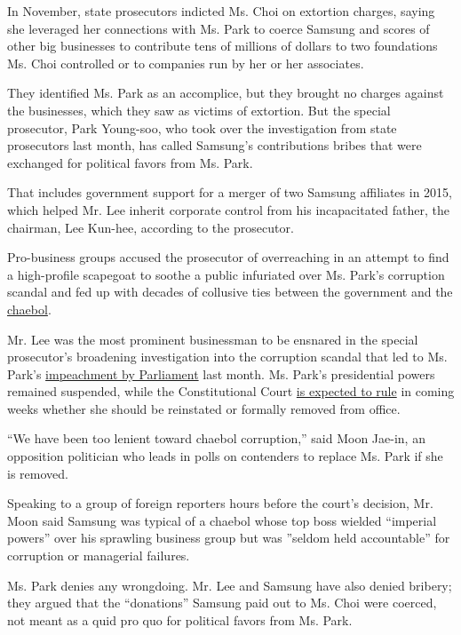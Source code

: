 In November, state prosecutors indicted Ms. Choi on extortion charges,
saying she leveraged her connections with Ms. Park to coerce Samsung and
scores of other big businesses to contribute tens of millions of dollars
to two foundations Ms. Choi controlled or to companies run by her or her
associates.

They identified Ms. Park as an accomplice, but they brought no charges
against the businesses, which they saw as victims of extortion. But the
special prosecutor, Park Young-soo, who took over the investigation from
state prosecutors last month, has called Samsung's contributions bribes
that were exchanged for political favors from Ms. Park.

That includes government support for a merger of two Samsung affiliates
in 2015, which helped Mr. Lee inherit corporate control from his
incapacitated father, the chairman, Lee Kun-hee, according to the
prosecutor.

Pro-business groups accused the prosecutor of overreaching in an attempt
to find a high-profile scapegoat to soothe a public infuriated over Ms.
Park's corruption scandal and fed up with decades of collusive ties
between the government and the
\href{https://www.nytimes.com/2017/01/16/business/lee-jae-yong-samsung.html}{chaebol}.

Mr. Lee was the most prominent businessman to be ensnared in the special
prosecutor's broadening investigation into the corruption scandal that
led to Ms. Park's
\href{https://www.nytimes.com/2016/12/09/world/asia/south-korea-president-park-geun-hye-impeached.html}{impeachment
by Parliament} last month. Ms. Park's presidential powers remained
suspended, while the Constitutional Court
\href{https://www.nytimes.com/2017/01/03/world/asia/south-korea-president-impeachment-trial.html}{is
expected to rule} in coming weeks whether she should be reinstated or
formally removed from office.

``We have been too lenient toward chaebol corruption,'' said Moon
Jae-in, an opposition politician who leads in polls on contenders to
replace Ms. Park if she is removed.

Speaking to a group of foreign reporters hours before the court's
decision, Mr. Moon said Samsung was typical of a chaebol whose top boss
wielded ``imperial powers'' over his sprawling business group but was
''seldom held accountable'' for corruption or managerial failures.

Ms. Park denies any wrongdoing. Mr. Lee and Samsung have also denied
bribery; they argued that the ``donations'' Samsung paid out to Ms. Choi
were coerced, not meant as a quid pro quo for political favors from Ms.
Park.

